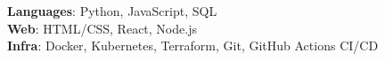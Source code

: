 
\begin{itemize}[leftmargin=0.15in, label={}]
  \small{\item{
    \textbf{Languages}{: Python, JavaScript, SQL} \\
    \textbf{Web}{: HTML/CSS, React, Node.js} \\
    \textbf{Infra}{: Docker, Kubernetes, Terraform, Git, GitHub Actions CI/CD} \\
  }}
\end{itemize}
